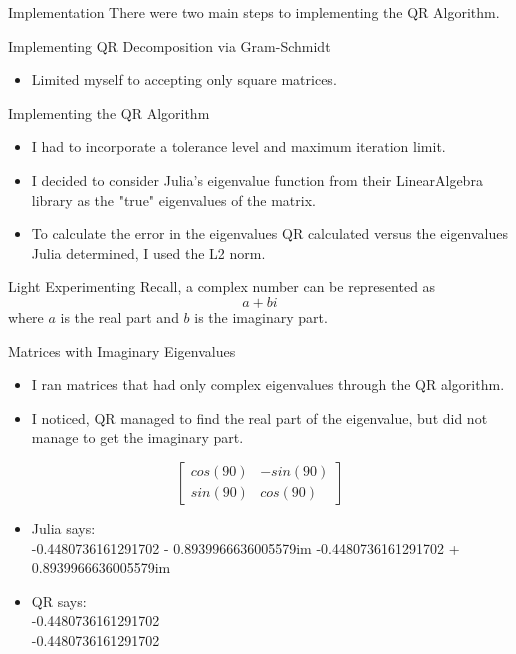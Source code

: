 \documentclass{beamer}
\begin{document}
\begin{frame}{Implementation}
There were two main steps to implementing the QR Algorithm.

\begin{block}{Implementing QR Decomposition via Gram-Schmidt}
	\begin{itemize}
		\item Limited myself to accepting only square matrices.
	\end{itemize}
\end{block}

\begin{block}{Implementing the QR Algorithm}
	\begin{itemize}
		\item I had to incorporate a tolerance level and maximum iteration limit.
		\item I decided to consider Julia's eigenvalue function from their LinearAlgebra library as the "true" eigenvalues of the matrix.
		\item To calculate the error in the eigenvalues QR calculated versus the eigenvalues Julia determined, I used the L2 norm.
	\end{itemize}
\end{block}
\end{frame}

\begin{frame}{Light Experimenting}
	Recall, a complex number can be represented as $$a + bi$$ where $a$ is the real part and $b$ is the imaginary part.
	
	\begin{block}{Matrices with Imaginary Eigenvalues}
		\begin{itemize}
			\item I ran matrices that had only complex eigenvalues through the QR algorithm.
			\item I noticed, QR managed to find the real part of the eigenvalue, but did not manage to get the imaginary part. 
		\end{itemize}
	\end{block}
\end{frame}

\begin{frame}{}
$$ \begin{bmatrix}
cos(90) & -sin(90) \\
sin(90) & cos(90) 
\end{bmatrix}  $$
	\begin{itemize}
	\item Julia says: 
	\\
	-0.4480736161291702 - 0.8939966636005579im
 -0.4480736161291702 + 0.8939966636005579im
 	\item QR says: 
 	\\
 	-0.4480736161291702
 	\\
 -0.4480736161291702
	\end{itemize}
\end{frame}
\end{document}
